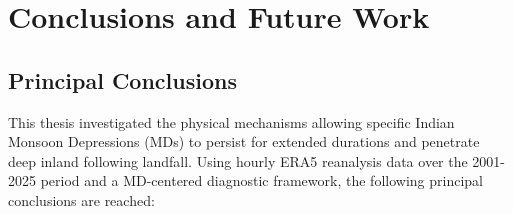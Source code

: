 \chapter{Conclusions and Future Work}
\label{ch:conclusions}

\section{Principal Conclusions}
\label{sec:conclusions_main}

This thesis investigated the physical mechanisms allowing specific
Indian Monsoon Depressions (MDs) to persist for extended durations
and penetrate deep inland following landfall. Using hourly ERA5
reanalysis data over the 2001-2025 period and a MD-centered
diagnostic framework, the following principal conclusions are reached:


